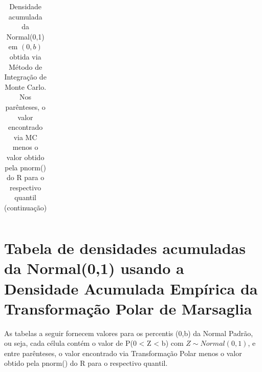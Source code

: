 \documentclass[
	article,			%
	12pt,				%
	twoside,			%
	a4paper,			%
	english,			%
	brazil,				%
	]{abntex2}
\begin{document}
\begin{landscape}
\begin{table}
\begin{tabular}{c||p{18mm}|p{18mm}|p{18mm}|p{18mm}|p{18mm}|p{18mm}|p{18mm}|p{18mm}|p{18mm}|p{18mm}|p{18mm}|p{18mm}|p{18mm}|p{18mm}|p{18mm}|p{18mm}|p{18mm}}
\end{tabular}
\caption{Densidade acumulada da Normal(0,1) em $(0,b)$ obtida via Método de Integração de Monte Carlo. Nos parênteses, o valor encontrado via MC menos o valor obtido pela pnorm() do R para o respectivo quantil (continuação)}
\end{table}

\end{landscape}
    \section{Tabela de densidades acumuladas da Normal(0,1) usando a Densidade Acumulada Empírica da Transformação Polar de Marsaglia}
    
        	As tabelas a seguir fornecem valores para os percentis (0,b) da Normal Padrão, ou seja, cada célula contém o valor de P(0 < Z < b) com $Z \sim Normal(0,1)$, e entre parênteses, o valor encontrado via Transformação Polar menos o valor obtido pela pnorm() do R para o respectivo quantil.
\end{document}
